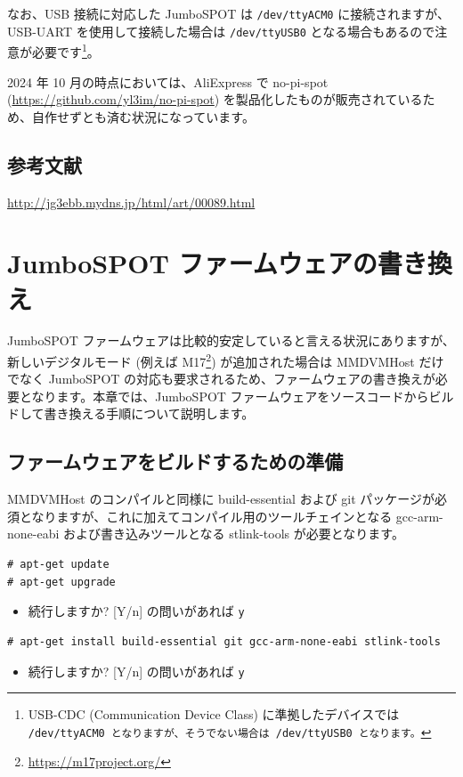\documentclass[a4j,oneside]{ujbook}
\begin{document}
なお、USB 接続に対応した JumboSPOT は \verb+/dev/ttyACM0+ に接続されますが、USB-UART を使用して接続した場合は \verb+/dev/ttyUSB0+ となる場合もあるので注意が必要です\footnote{USB-CDC (Communication Device Class) に準拠したデバイスでは \tt{/dev/ttyACM0} となりますが、そうでない場合は \tt{/dev/ttyUSB0} となります。}。

2024 年 10 月の時点においては、AliExpress で no-pi-spot (\url{https://github.com/yl3im/no-pi-spot}) を製品化したものが販売されているため、自作せずとも済む状況になっています。

\section{参考文献}
\begin{description}[style=nextline]
 \item [JumboSPOT+bluetooth] \url{http://jg3ebb.mydns.jp/html/art/00089.html}
\end{description}

\chapter{JumboSPOT ファームウェアの書き換え}

JumboSPOT ファームウェアは比較的安定していると言える状況にありますが、新しいデジタルモード (例えば M17\footnote{\url{https://m17project.org/}}) が追加された場合は MMDVMHost だけでなく JumboSPOT の対応も要求されるため、ファームウェアの書き換えが必要となります。本章では、JumboSPOT ファームウェアをソースコードからビルドして書き換える手順について説明します。

\section{ファームウェアをビルドするための準備}

MMDVMHost のコンパイルと同様に build-essential および git パッケージが必須となりますが、これに加えてコンパイル用のツールチェインとなる gcc-arm-none-eabi および書き込みツールとなる stlink-tools が必要となります。

\begin{verbatim}
# apt-get update
# apt-get upgrade
\end{verbatim}
\begin{itemize}
 \renewcommand{\labelitemi}{$\triangleright$}
 \item 続行しますか? [Y/n] の問いがあれば \verb+y+
\end{itemize}
\begin{verbatim}
# apt-get install build-essential git gcc-arm-none-eabi stlink-tools
\end{verbatim}
\begin{itemize}
 \renewcommand{\labelitemi}{$\triangleright$}
 \item 続行しますか? [Y/n] の問いがあれば \verb+y+
\end{itemize}
\end{document}

